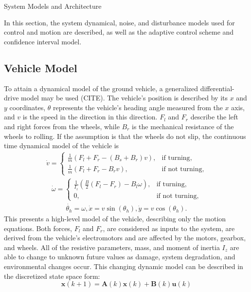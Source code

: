 \begin{section}{System Models and Architecture}
	
\label{sec:modeling}
In this section, the system dynamical, noise, and disturbance models used for control and motion are described, as well as the adaptive control scheme and confidence interval model.


\subsection{Vehicle Model}
To attain a dynamical model of the ground vehicle, a generalized differential-drive model may be used (CITE). The vehicle's position is described by its $x$ and $y$ coordinates, $\theta$ represents the vehicle's heading angle measured from the $x$ axis, and $v$ is the speed in the direction in this direction. $F_l$ and $F_r$ describe the left and right forces from the wheels, while $B_r$ is the mechanical resistance of the wheels to rolling. If the assumption is that the wheels do not slip, the continuous time dynamical model of the vehicle is
    \begin{align}
        \dot{v}=\begin{cases}
            \frac{1}{m}(F_l+F_r-(B_s+B_r)v), & \text{if turning},\\
            \frac{1}{m}(F_l+F_r-B_rv), & \text{if not turning},
        \end{cases}
    \end{align}
    \begin{align}
        \dot{\omega}=\begin{cases}
            \frac{1}{I_z}(\frac{B}{2}(F_l-F_r)-B_l\omega), &\text{if turning},\\
            0, & \text{if not turning},
        \end{cases}
	\end{align}
	\begin{align}
        \dot{\theta_h}=\omega, \dot{x}=v\sin(\theta_h), \dot{y}=v\cos(\theta_h).
	\end{align}
This presents a high-level model of the vehicle, describing only the motion equations. Both forces, $F_l$ and $F_r$, are considered as inputs to the system, are derived from the vehicle's electromotors and are affected by the motors, gearbox, and wheels. All of the resistive parameters, mass, and moment of inertia $I_z$ are able to change to unknown future values as damage, system degradation, and environmental changes occur. This changing dynamic model can be described in the discretized state space form:
    \begin{equation}
	\bm{x}(k+1) = \bm{A}(k)\bm{x}(k) + \bm{B}(k)\bm{u}(k)
	\end{equation}


\end{section}
